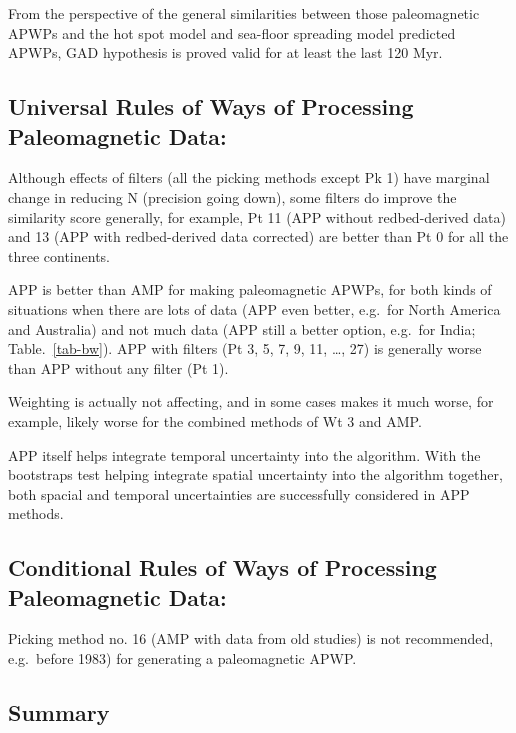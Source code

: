 From the perspective of the general similarities between those paleomagnetic
APWPs and the hot spot model and sea-floor spreading model predicted APWPs, GAD
hypothesis is proved valid for at least the last 120 Myr.

\subsection{Universal Rules of Ways of Processing Paleomagnetic Data:}
%
\begin{description}
  \item Although effects of filters (all the picking methods except Pk 1) have
		marginal change in reducing N (precision going down), some filters do
		improve the similarity score generally, for example, Pt 11 (APP without
		redbed-derived data) and 13 (APP with redbed-derived data corrected) are
		better than Pt 0 for all the three continents.
  \item APP is better than AMP for making paleomagnetic APWPs, for both kinds
		of situations when there are lots of data (APP even better, e.g.\ for
		North America and Australia) and not much data (APP still a better
		option, e.g.\ for India; Table.~\ref{tab-bw}). APP with filters (Pt
		3, 5, 7, 9, 11, \ldots, 27) is generally worse than APP without any
		filter (Pt 1).
  \item Weighting is actually not affecting, and in some cases makes it much
		worse, for example, likely worse for the combined methods of Wt 3 and
		AMP.
  \item APP itself helps integrate temporal uncertainty into the algorithm. With
		the bootstraps test helping integrate spatial uncertainty into the
		algorithm together, both spacial and temporal uncertainties are
		successfully considered in APP methods.
\end{description}

\subsection{Conditional Rules of Ways of Processing Paleomagnetic Data:}
%
\begin{description}
  \item Picking method no. 16 (AMP with data from old studies) is not
		recommended, e.g.\ before 1983) for generating a paleomagnetic APWP.
\end{description}

\subsection{Summary}

